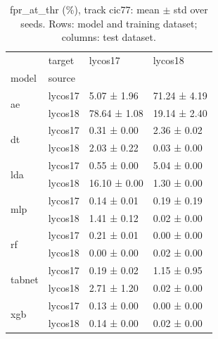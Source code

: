 \begin{table}
\caption{fpr_at_thr (\%), track cic77: mean $\pm$ std over seeds. Rows: model and training dataset; columns: test dataset.}
\label{tab:matrix_cic77_fpr_at_thr}
\begin{tabular}{llll}
\toprule
 & target & lycos17 & lycos18 \\
model & source &  &  \\
\midrule
\multirow[t]{2}{*}{ae} & lycos17 & 5.07 ± 1.96 & 71.24 ± 4.19 \\
 & lycos18 & 78.64 ± 1.08 & 19.14 ± 2.40 \\
\cline{1-4}
\multirow[t]{2}{*}{dt} & lycos17 & 0.31 ± 0.00 & 2.36 ± 0.02 \\
 & lycos18 & 2.03 ± 0.22 & 0.03 ± 0.00 \\
\cline{1-4}
\multirow[t]{2}{*}{lda} & lycos17 & 0.55 ± 0.00 & 5.04 ± 0.00 \\
 & lycos18 & 16.10 ± 0.00 & 1.30 ± 0.00 \\
\cline{1-4}
\multirow[t]{2}{*}{mlp} & lycos17 & 0.14 ± 0.01 & 0.19 ± 0.19 \\
 & lycos18 & 1.41 ± 0.12 & 0.02 ± 0.00 \\
\cline{1-4}
\multirow[t]{2}{*}{rf} & lycos17 & 0.21 ± 0.01 & 0.00 ± 0.00 \\
 & lycos18 & 0.00 ± 0.00 & 0.02 ± 0.00 \\
\cline{1-4}
\multirow[t]{2}{*}{tabnet} & lycos17 & 0.19 ± 0.02 & 1.15 ± 0.95 \\
 & lycos18 & 2.71 ± 1.20 & 0.02 ± 0.00 \\
\cline{1-4}
\multirow[t]{2}{*}{xgb} & lycos17 & 0.13 ± 0.00 & 0.00 ± 0.00 \\
 & lycos18 & 0.14 ± 0.00 & 0.02 ± 0.00 \\
\cline{1-4}
\bottomrule
\end{tabular}
\end{table}
